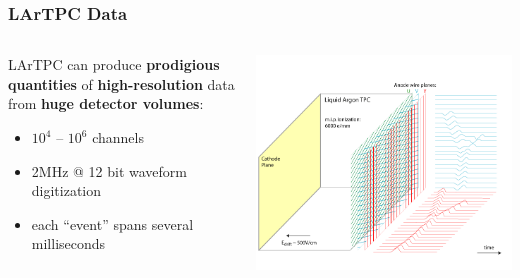 \begin{frame}
  \frametitle{LArTPC Data}
  
  \vspace{-10mm}

  \begin{columns}
    \begin{column}{0.8\textwidth}
      LArTPC can produce \textbf{prodigious quantities} of \textbf{high-resolution} data from \textbf{huge detector volumes}:
      \begin{itemize}
      \item $10^4$ -- $10^6$ channels
      \item 2MHz @ 12 bit waveform digitization
      \item each ``event'' spans several milliseconds
      \end{itemize}
    \end{column}
    \begin{column}{0.2\textwidth}
      \begin{center}
        \includegraphics[width=\textwidth,trim=13cm 0cm 0cm 0cm,clip]{signal-15.png}

      \end{center}
    \end{column}
  \end{columns}

  \vspace{-5mm}


\end{frame}
